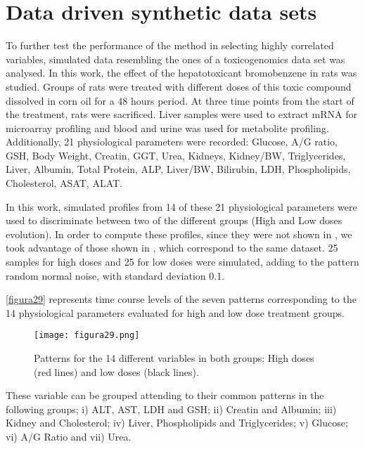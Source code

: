 \section{Data driven synthetic data sets}
To further test the performance of the method in selecting highly correlated variables, simulated data resembling the ones of a  toxicogenomics data set \parencite{heijne2004bromobenzene} was analysed. In this work, the effect of the hepatotoxicant bromobenzene in rats was studied. Groups of rats were treated with different doses of this toxic compound dissolved in corn oil for a 48 hours period. At three time points from the start of the treatment, rats were sacrificed. Liver samples were used to extract mRNA for microarray profiling and blood and urine was used for metabolite profiling. Additionally, 21 physiological parameters were recorded: Glucose, A/G ratio, GSH, Body Weight, Creatin, GGT, Urea, Kidneys, Kidney/BW, Triglycerides, Liver, Albumin, Total Protein, ALP, Liver/BW, Bilirubin, LDH, Phospholipids, Cholesterol, ASAT, ALAT. 

In this work, simulated profiles from 14 of these 21 physiological parameters were used to discriminate between two of the different groups (High and Low doses evolution). In order to compute these profiles, since they were not shown in \parencite{heijne2004bromobenzene}, we took advantage of those shown in \cite{conesa2010multiway}, which correspond to the same dataset. 25 samples for high doses and 25 for low doses were simulated, adding to the pattern random normal noise, with standard deviation 0.1.

\autoref{figura29} represents time course levels of the seven patterns corresponding to the 14 physiological parameters evaluated for high and low dose treatment groups. 

\begin{figure}[hbtp]
	\centering
\texttt{[image: figura29.png]}
\caption{Patterns for the 14 different variables in both groups: High doses (red lines) and low doses (black lines).}
\label{figura29}
\end{figure}

These variable can be grouped attending to their common patterns in the following groups; i) ALT, AST, LDH and GSH; ii) Creatin and Albumin; iii) Kidney and Cholesterol; iv) Liver, Phospholipids and Triglycerides; v) Glucose; vi) A/G Ratio and vii) Urea.

